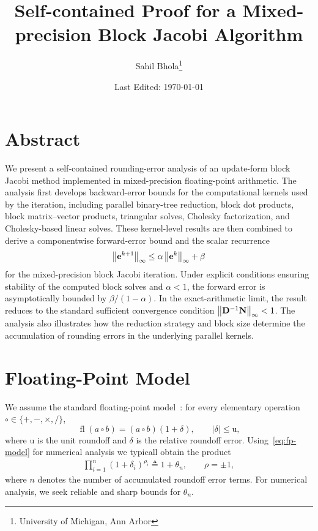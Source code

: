 \documentclass[11pt,draft]{article}
\title{Self-contained Proof for a Mixed-precision Block Jacobi Algorithm}
\author{Sahil Bhola\thanks{University of Michigan, Ann Arbor}}
\date{Last Edited: \today}
\newcommand{\urd}{\ensuremath{\mathrm{u}}}
\newcommand{\define}{\ensuremath{\triangleq}}
\newcommand{\vect}[1]{\mathbf{\MakeLowercase{#1}}}
\newcommand{\mat}[1]{\mathbf{\MakeUppercase{#1}}}
\newcommand{\norm}[2][]{\left\|#2\right\|_{#1}}
\theoremstyle{definition}
\theoremstyle{remark}
\DeclareMathOperator{\fl}{fl}
\newcommand{\abs}[1]{\left|#1\right|}
\begin{document}
\maketitle

\section*{Abstract}
We present a self-contained rounding-error analysis of an update-form
block Jacobi method implemented in mixed-precision floating-point
arithmetic. The analysis first develops backward-error bounds for the
computational kernels used by the iteration, including parallel binary-tree
reduction, block dot products, block matrix--vector products, triangular
solves, Cholesky factorization, and Cholesky-based linear solves. These
kernel-level results are then combined to derive a componentwise
forward-error bound and the scalar recurrence
\begin{align*}
    \norm[\infty]{\vect{e}^{k+1}}
    \leq
    \alpha\norm[\infty]{\vect{e}^{k}}+\beta
\end{align*}
for the mixed-precision block Jacobi iteration. Under explicit conditions
ensuring stability of the computed block solves and $\alpha<1$, the
forward error is asymptotically bounded by $\beta/(1-\alpha)$. In the
exact-arithmetic limit, the result reduces to the standard sufficient
convergence condition
$\norm[\infty]{\mat{d}^{-1}\mat{n}}<1$. The analysis also illustrates how
the reduction strategy and block size determine the accumulation of
rounding errors in the underlying parallel kernels.

\section{Floating-Point Model}
We assume the standard floating-point model~\cite{higham2002accuracy}: for every elementary
operation $\circ \in \{+,-,\times,/\}$,
\begin{equation}
    \fl(a \circ b) = (a \circ b)(1+\delta),
    \qquad
    \abs{\delta} \le \urd,
    \label{eq:fp-model}
\end{equation}
where $\urd$ is the unit roundoff and $\delta$ is the relative roundoff error.
Using~\cref{eq:fp-model} for numerical analysis we typicall obtain the product
\begin{align}
    \prod_{i=1}^n (1 + \delta_i)^{\rho_i} \define 1 + \theta_n, \qquad \rho = \pm 1,
    \label{eq:theta_n}
\end{align}
where $n$ denotes the number of accumulated roundoff error terms.
For numerical analysis, we seek reliable and sharp bounds for $\theta_n$.
\end{document}
